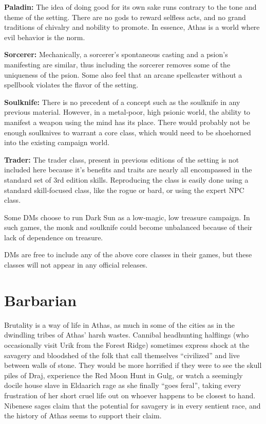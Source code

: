 \documentclass[10pt,a4paper,twocolumn]{d20}
\begin{document}
{\textbf{Paladin:} The idea of doing good for its own sake runs contrary to the tone and theme of the setting. There are no gods to reward selfless acts, and no grand traditions of chivalry and nobility to promote. In essence, Athas is a world where evil behavior is the norm.

\textbf{Sorcerer:} Mechanically, a sorcerer’s spontaneous casting and a psion’s manifesting are similar, thus including the sorcerer removes some of the uniqueness of the psion. Some also feel that an arcane spellcaster without a spellbook violates the flavor of the setting.

\textbf{Soulknife:} There is no precedent of a concept such as the soulknife in any previous material. However, in a metal‐poor, high psionic world, the ability to manifest a weapon using the mind has its place. There would probably not be enough soulknives to warrant a core class, which would need to be shoehorned into the existing campaign world.

\textbf{Trader:} The trader class, present in previous editions of the setting is not included here because it’s benefits and traits are nearly all encompassed in the standard set of 3rd edition skills. Reproducing the class is easily done using a standard skill‐focused class, like the rogue or bard, or using the expert NPC class.

Some DMs choose to run Dark Sun as a low‐magic, low treasure campaign. In such games, the monk and soulknife could become unbalanced because of their lack of dependence on treasure.

DMs are free to include any of the above core classes in their games, but these classes will not appear in any official releases.

\section{Barbarian}

Brutality is a way of life in Athas, as much in some of the cities as in the dwindling tribes of Athas’ harsh wastes. Cannibal headhunting halflings (who occasionally visit Urik from the Forest Ridge) sometimes express shock at the savagery and bloodshed of the folk that call themselves ``civilized'' and live between walls of stone. They would be more horrified if they were to see the skull piles of Draj, experience the Red Moon Hunt in Gulg, or watch a seemingly docile house slave in Eldaarich rage as she finally ``goes feral'', taking every frustration of her short cruel life out on whoever happens to be closest to hand. Nibenese sages claim that the potential for savagery is in every sentient race, and the history of Athas seems to support their claim.

}
\end{document}
